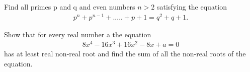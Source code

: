 \item Find all primes p and q and even numbers $n > 2$ satisfying the equation
\begin{align*} 
p^{n} + p^{n-1} +.....+ p+1 = q^{2} + q + 1.
\end{align*}

\item Show that for every real number a the equation
\begin{align*}
8x^{4} - 16x^{3} + 16x^{2} - 8x + a = 0
\end{align*}
has at least real non-real root and find the sum of all the non-real roots of the equation.

















